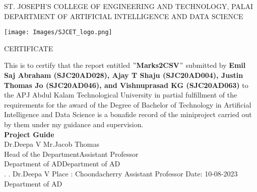 \thispagestyle{empty}
\begin{center}
\normalsize{ST. JOSEPH’S COLLEGE OF ENGINEERING AND TECHNOLOGY, PALAI}\\[0.5cm]
\normalsize
 { DEPARTMENT OF ARTIFICIAL INTELLIGENCE AND DATA SCIENCE}\\[1.0cm]%
   \begin{center}
   \texttt{[image: Images/SJCET\_logo.png]}
   \end{center}
{\large CERTIFICATE}\\[1.5cm]
\end{center}
\normalsize 
This is to certify that the report entitled {\bf $"$Marks2CSV$"$} submitted by { \bf Emil Saj \mbox{Abraham} (SJC20AD028), Ajay T Shaju (SJC20AD004), Justin Thomas Jo (\mbox{SJC20AD046}), and Vishnuprasad KG (SJC20AD063)} to the APJ Abdul Kalam Technological University in partial fulfillment of the requirements for the award of the Degree of Bachelor of Technology in Artificial Intelligence and Data Science is a bonafide record of the miniproject carried out by them under my guidance and supervision.\vspace{1.3 cm}\\
{\bf Project Guide}\hspace{8.35 cm}{\bf Project Coordinator}\\
Dr.Deepa V\hspace{9.0 cm} Mr.Jacob Thomas\\
Head of the Department\hspace{6.85 cm}Assistant Professor\hspace{2.6 cm}\\Department of AD\hspace{7.9 cm}Department of AD
\vspace{1.3 cm}\\
.\hspace{11.06 cm}{\bf Head of the Department}
\newline
.\hspace{11.01 cm} Dr.Deepa V
\newline
Place : Choondacherry  \hspace{6.87 cm} Assistant Professor
\newline
Date\hspace{0.25 cm}: 10-08-2023 \hspace{7.7 cm} Department of AD      





